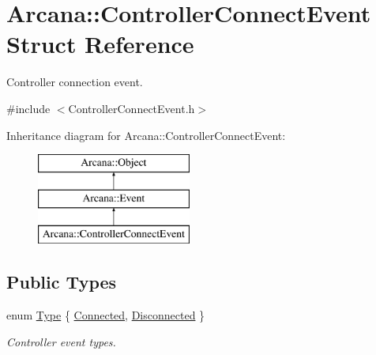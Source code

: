 \hypertarget{struct_arcana_1_1_controller_connect_event}{}\section{Arcana\+:\+:Controller\+Connect\+Event Struct Reference}
\label{struct_arcana_1_1_controller_connect_event}


Controller connection event.  




{\ttfamily \#include $<$Controller\+Connect\+Event.\+h$>$}

Inheritance diagram for Arcana\+:\+:Controller\+Connect\+Event\+:\begin{figure}[H]
\begin{center}
\leavevmode
\includegraphics[height=3.000000cm]{struct_arcana_1_1_controller_connect_event}
\end{center}
\end{figure}
\subsection*{Public Types}
\begin{DoxyCompactItemize}
\item 
enum \mbox{\hyperlink{struct_arcana_1_1_controller_connect_event_a13728f4573db87b8b2ef1fc5f9bebc38}{Type}} \{ \mbox{\hyperlink{struct_arcana_1_1_controller_connect_event_a13728f4573db87b8b2ef1fc5f9bebc38a69a33132305627b0998298b76c0f4884}{Connected}}, 
\mbox{\hyperlink{struct_arcana_1_1_controller_connect_event_a13728f4573db87b8b2ef1fc5f9bebc38a067289f89919e46e32ef1a8896c8c2a6}{Disconnected}}
 \}
\begin{DoxyCompactList}\small\item\em Controller event types. \end{DoxyCompactList}\end{DoxyCompactItemize}
